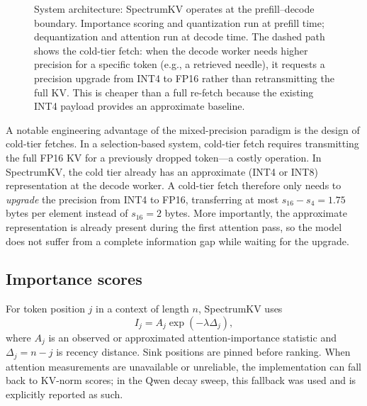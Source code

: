 \documentclass[11pt]{article}
\newcommand{\method}{SpectrumKV}
\theoremstyle{plain}
\theoremstyle{definition}
\begin{document}
\begin{figure}[t]
{%
}
\caption{System architecture: \method{} operates at the prefill--decode boundary.  Importance scoring and quantization run at prefill time; dequantization and attention run at decode time.  The dashed path shows the cold-tier fetch: when the decode worker needs higher precision for a specific token (e.g., a retrieved needle), it requests a precision upgrade from INT4 to FP16 rather than retransmitting the full KV.  This is cheaper than a full re-fetch because the existing INT4 payload provides an approximate baseline.}
\label{fig:sysarch}
\end{figure}

A notable engineering advantage of the mixed-precision paradigm is the design of cold-tier fetches.  In a selection-based system, cold-tier fetch requires transmitting the full FP16 KV for a previously dropped token---a costly operation.  In \method{}, the cold tier already has an approximate (INT4 or INT8) representation at the decode worker.  A cold-tier fetch therefore only needs to \emph{upgrade} the precision from INT4 to FP16, transferring at most $s_{16}-s_4 = 1.75$ bytes per element instead of $s_{16} = 2$ bytes.  More importantly, the approximate representation is already present during the first attention pass, so the model does not suffer from a complete information gap while waiting for the upgrade.

\subsection{Importance scores}
For token position $j$ in a context of length $n$, \method{} uses
\begin{equation}
  I_j = A_j \exp(-\lambda \Delta_j),
  \label{eq:importance}
\end{equation}
where $A_j$ is an observed or approximated attention-importance statistic and $\Delta_j=n-j$ is recency distance.  Sink positions are pinned before ranking.  When attention measurements are unavailable or unreliable, the implementation can fall back to KV-norm scores; in the Qwen decay sweep, this fallback was used and is explicitly reported as such.
\end{document}
